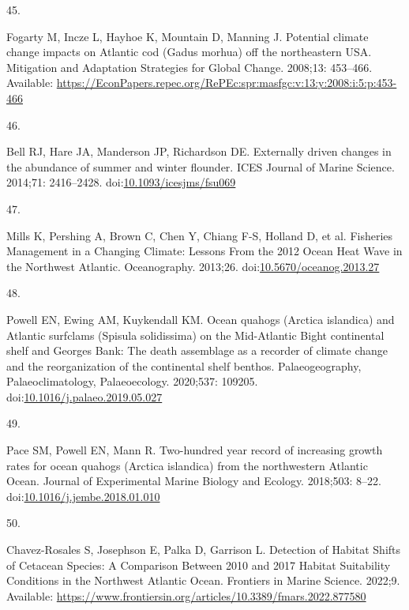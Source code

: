\documentclass[
  10pt,
]{article}
\newlength{\cslhangindent}
\newlength{\csllabelwidth}
\newlength{\cslentryspacingunit} %
\newenvironment{CSLReferences}[2] %
 {%
  \setlength{\parindent}{0pt}
  \ifodd #1
  \let\oldpar\par
  \def\par{\hangindent=\cslhangindent\oldpar}
  \fi
  \setlength{\parskip}{#2\cslentryspacingunit}
 }%
 {}
\newcommand{\CSLLeftMargin}[1]{\parbox[t]{\csllabelwidth}{#1}}
\newcommand{\CSLRightInline}[1]{\parbox[t]{\linewidth - \csllabelwidth}{#1}\break}
\begin{document}
\begin{CSLReferences}{0}{0}
\leavevmode{}%
\CSLLeftMargin{45. }%
\CSLRightInline{Fogarty M, Incze L, Hayhoe K, Mountain D, Manning J. {Potential climate change impacts on Atlantic cod (Gadus morhua) off the northeastern USA}. Mitigation and Adaptation Strategies for Global Change. 2008;13: 453--466. Available: \url{https://EconPapers.repec.org/RePEc:spr:masfgc:v:13:y:2008:i:5:p:453-466}}

\leavevmode{}%
\CSLLeftMargin{46. }%
\CSLRightInline{Bell RJ, Hare JA, Manderson JP, Richardson DE. {Externally driven changes in the abundance of summer and winter flounder}. ICES Journal of Marine Science. 2014;71: 2416--2428. doi:\href{https://doi.org/10.1093/icesjms/fsu069}{10.1093/icesjms/fsu069}}

\leavevmode{}%
\CSLLeftMargin{47. }%
\CSLRightInline{Mills K, Pershing A, Brown C, Chen Y, Chiang F-S, Holland D, et al. Fisheries {Management} in a {Changing} {Climate}: {Lessons} {From} the 2012 {Ocean} {Heat} {Wave} in the {Northwest} {Atlantic}. Oceanography. 2013;26. doi:\href{https://doi.org/10.5670/oceanog.2013.27}{10.5670/oceanog.2013.27}}

\leavevmode{}%
\CSLLeftMargin{48. }%
\CSLRightInline{Powell EN, Ewing AM, Kuykendall KM. Ocean quahogs ({Arctica} islandica) and {Atlantic} surfclams ({Spisula} solidissima) on the {Mid}-{Atlantic} {Bight} continental shelf and {Georges} {Bank}: {The} death assemblage as a recorder of climate change and the reorganization of the continental shelf benthos. Palaeogeography, Palaeoclimatology, Palaeoecology. 2020;537: 109205. doi:\href{https://doi.org/10.1016/j.palaeo.2019.05.027}{10.1016/j.palaeo.2019.05.027}}

\leavevmode{}%
\CSLLeftMargin{49. }%
\CSLRightInline{Pace SM, Powell EN, Mann R. Two-hundred year record of increasing growth rates for ocean quahogs ({Arctica} islandica) from the northwestern {Atlantic} {Ocean}. Journal of Experimental Marine Biology and Ecology. 2018;503: 8--22. doi:\href{https://doi.org/10.1016/j.jembe.2018.01.010}{10.1016/j.jembe.2018.01.010}}

\leavevmode{}%
\CSLLeftMargin{50. }%
\CSLRightInline{Chavez-Rosales S, Josephson E, Palka D, Garrison L. Detection of {Habitat} {Shifts} of {Cetacean} {Species}: {A} {Comparison} {Between} 2010 and 2017 {Habitat} {Suitability} {Conditions} in the {Northwest} {Atlantic} {Ocean}. Frontiers in Marine Science. 2022;9. Available: \url{https://www.frontiersin.org/articles/10.3389/fmars.2022.877580}}


\end{CSLReferences}
\end{document}
